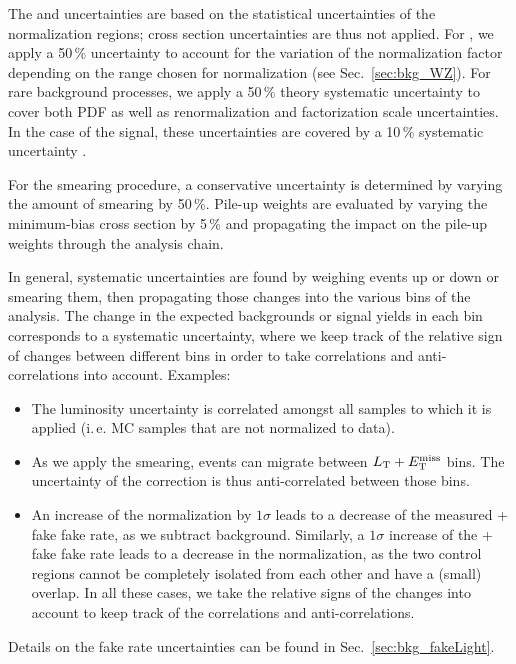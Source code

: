 The \ZZ and \ttbar uncertainties are based on the statistical uncertainties of the normalization regions; cross section uncertainties are thus not applied. For \WZ, we apply a 50\,\% uncertainty to account for the variation of the normalization factor depending on the \MET range chosen for normalization (see Sec.~\ref{sec:bkg_WZ}). For rare background processes, we apply a 50\,\% theory systematic uncertainty to cover both PDF as well as renormalization and factorization scale uncertainties. In the case of the signal, these uncertainties are covered by a 10\,\% systematic uncertainty \cite{CMS-PAS-EXO-14-001}.

For the \MET smearing procedure, a conservative uncertainty is determined by varying the amount of smearing by 50\,\%. Pile-up weights are evaluated by varying the minimum-bias cross section by 5\,\% and propagating the impact on the pile-up weights through the analysis chain.

In general, systematic uncertainties are found by weighing events up or down or smearing them, then propagating those changes into the various bins of the analysis. The change in the expected backgrounds or signal yields in each bin corresponds to a systematic uncertainty, where we keep track of the relative sign of changes between different bins in order to take correlations and anti-correlations into account. Examples:
\begin{itemize}
	\item The luminosity uncertainty is correlated amongst all samples to which it is applied (i.\,e. MC samples that are not normalized to data). 
	\item As we apply the \MET smearing, events can migrate between $L_\textrm{T} + E_{\mathrm{T}}^{\text{miss}}$ bins. The uncertainty of the correction is thus anti-correlated between those bins. 
	\item An increase of the \WZ normalization by $1\sigma$ leads to a decrease of the measured \Z + fake fake rate, as we subtract \WZ background. Similarly, a $1\sigma$ increase of the \Z + fake fake rate leads to a decrease in the \WZ normalization, as the two control regions cannot be completely isolated from each other and have a (small) overlap. In all these cases, we take the relative signs of the changes into account to keep track of the correlations and anti-correlations.
\end{itemize}

Details on the fake rate uncertainties can be found in Sec.~\ref{sec:bkg_fakeLight}.
